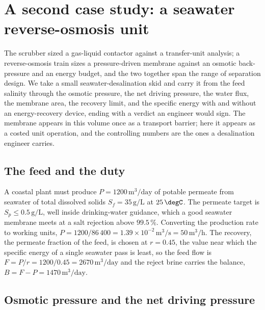 \section{A second case study: a seawater reverse-osmosis unit}

The scrubber sized a gas-liquid contactor against a transfer-unit
analysis; a reverse-osmosis train sizes a pressure-driven membrane
against an osmotic back-pressure and an energy budget, and the two
together span the range of separation design. We take a small
seawater-desalination skid and carry it from the feed salinity through
the osmotic pressure, the net driving pressure, the water flux, the
membrane area, the recovery limit, and the specific energy with and
without an energy-recovery device, ending with a verdict an engineer
would sign. The membrane appears in this volume once as a transport
barrier; here it appears as a costed unit operation, and the controlling
numbers are the ones a desalination engineer carries.

\subsection{The feed and the duty}

A coastal plant must produce $P = 1200\,\text{m}^3/\text{day}$ of potable
permeate from seawater of total dissolved solids $S_f = 35\,\text{g/L}$
at $25\,\degC$. The permeate target is $S_p \le 0.5\,\text{g/L}$, well
inside drinking-water guidance, which a good seawater membrane meets at a
salt rejection above $99.5\,\%$. Converting the production rate to working
units, $P = 1200/86\,400 = 1.39\times 10^{-2}\,\text{m}^3/\text{s} =
50\,\text{m}^3/\text{h}$. The recovery, the permeate fraction of the
feed, is chosen at $r = 0.45$, the value near which the specific energy of
a single seawater pass is least, so the feed flow is $F = P/r =
1200/0.45 = 2670\,\text{m}^3/\text{day}$ and the reject brine carries
the balance, $B = F - P = 1470\,\text{m}^3/\text{day}$.

\subsection{Osmotic pressure and the net driving pressure}

